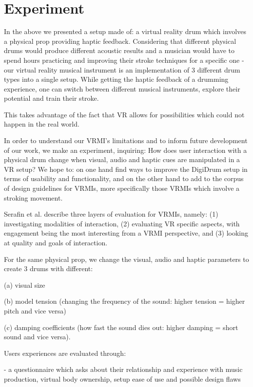 \documentclass{vgtc}
\begin{document}
\section{Experiment}\label{sec:exp}

In the above we presented a setup made of: a virtual reality drum which involves a physical prop providing haptic feedback. Considering that different physical drums would produce different acoustic results and a musician would have to spend hours practicing and improving their stroke techniques for a specific one - our virtual reality musical instrument is an implementation of 3 different drum types into a single setup. While getting the haptic feedback of a drumming experience, one can switch between different musical instruments, explore their potential and train their stroke. 

This takes advantage of the fact that VR allows for possibilities which could not happen in the real world.

In order to understand our VRMI's limitations and to inform future development of our work, we make an experiment, inquiring: How does user interaction with a physical drum change when visual, audio and haptic cues are manipulated in a VR setup?  We hope to: on one hand find ways to improve the DigiDrum setup in terms of usability and functionality, and on the other hand to add to the corpus of design guidelines for VRMIs, more specifically those VRMIs which involve a stroking movement.

Serafin et al. \cite{Serafin:2016} describe three layers of evaluation for VRMIs, namely: (1) investigating modalities of interaction, (2) evaluating VR specific aspects, with engagement being the most interesting from a VRMI perspective, and (3) looking at quality and goals of interaction.

For the same physical prop, we change the visual, audio and haptic parameters to create 3 drums with different:

(a) visual size

(b) model tension (changing the frequency of the sound: higher tension = higher pitch and vice versa)

(c) damping coefficients (how fast the sound dies out: higher damping = short sound and vice versa).

Users experiences are evaluated through:

- a questionnaire which asks about their relationship and experience with music production, virtual body ownership, setup ease of use and possible design flaws
\end{document}
